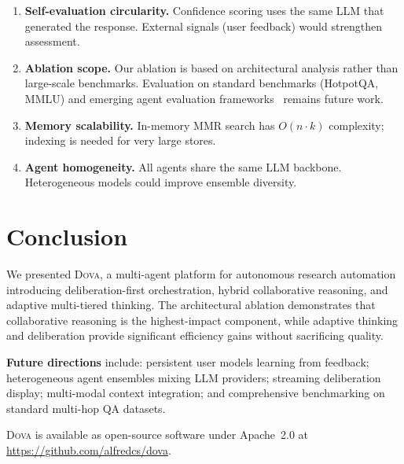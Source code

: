\documentclass{article}
\theoremstyle{plain}
\theoremstyle{definition}
\newcommand{\dova}{\textsc{Dova}}
\begin{document}
\begin{enumerate}
  \item \textbf{Self-evaluation circularity.}  Confidence scoring uses the
    same LLM that generated the response.  External signals (user feedback)
    would strengthen assessment.
  \item \textbf{Ablation scope.}  Our ablation is based on architectural
    analysis rather than large-scale benchmarks.  Evaluation on standard
    benchmarks (HotpotQA, MMLU) and emerging agent evaluation
    frameworks~\citep{ferrag2025agents} remains future work.
  \item \textbf{Memory scalability.}  In-memory MMR search has $O(n \cdot k)$
    complexity; indexing is needed for very large stores.
  \item \textbf{Agent homogeneity.}  All agents share the same LLM backbone.
    Heterogeneous models could improve ensemble diversity.
\end{enumerate}

\section{Conclusion}\label{sec:conclusion}

We presented \dova{}, a multi-agent platform for autonomous research automation
introducing deliberation-first orchestration, hybrid collaborative reasoning,
and adaptive multi-tiered thinking.  The architectural ablation demonstrates
that collaborative reasoning is the highest-impact component, while adaptive
thinking and deliberation provide significant efficiency gains without
sacrificing quality.

\textbf{Future directions} include:
persistent user models learning from feedback;
heterogeneous agent ensembles mixing LLM providers;
streaming deliberation display;
multi-modal context integration;
and comprehensive benchmarking on standard multi-hop QA datasets.

\dova{} is available as open-source software under Apache~2.0 at
\url{https://github.com/alfredcs/dova}.



\end{document}
